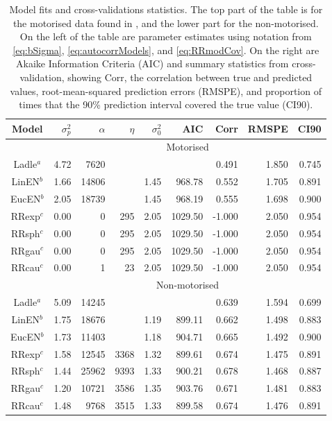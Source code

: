\documentclass[11pt, titlepage]{article}\usepackage[]{graphicx}\usepackage[]{color}
\begin{document}
\begin{spacing}{1.9}
\begin{flushleft}
\newpage
\begin{table}[ht]
				\caption{Model fits and cross-validations statistics. The top part of the table is for the motorised data found in \citet{Ladl:Avga:Whea:Boyc:pred:2016}, and the lower part for the non-motorised. On the left of the table are parameter estimates using notation from \ref{eq:bSigma}, \ref{eq:autocorrModels}, and \ref{eq:RRmodCov}. On the right are Akaike Information Criteria (AIC) and summary statistics from cross-validation, showing Corr, the correlation between true and predicted values, root-mean-squared prediction errors (RMSPE), and proportion of times that the 90\% prediction interval covered the true value (CI90).  \label{Tab:CVstats}}
\begin{center}
\begin{tabular}{c|rrrr|rrrr}
  \hline
  \hline
  Model & $\sigma^2_p$ & $\alpha$ & $\eta$ & $\sigma^2_0$ & AIC & Corr & RMSPE & CI90 \\
	\hline
	& \multicolumn{8}{c}{Motorised} \\
  \hline
Ladle$^a$ & 4.72 & 7620 &  &  &  & 0.491 & 1.850 & 0.745 \\ 
  LinEN$^b$ & 1.66 & 14806 &  & 1.45 & 968.78 & 0.552 & 1.705 & 0.891 \\ 
  EucEN$^b$ & 2.05 & 18739 &  & 1.45 & 968.19 & 0.555 & 1.698 & 0.900 \\ 
  RRexp$^c$ & 0.00 & 0 & 295 & 2.05 & 1029.50 & -1.000 & 2.050 & 0.954 \\ 
  RRsph$^c$ & 0.00 & 0 & 295 & 2.05 & 1029.50 & -1.000 & 2.050 & 0.954 \\ 
  RRgau$^c$ & 0.00 & 0 & 295 & 2.05 & 1029.50 & -1.000 & 2.050 & 0.954 \\ 
  RRcau$^c$ & 0.00 & 1 & 23 & 2.05 & 1029.50 & -1.000 & 2.050 & 0.954 \\ 
   \hline

	& \multicolumn{8}{c}{Non-motorised} \\
  \hline
Ladle$^a$ & 5.09 & 14245 &  &  &  & 0.639 & 1.594 & 0.699 \\ 
  LinEN$^b$ & 1.75 & 18676 &  & 1.19 & 899.11 & 0.662 & 1.498 & 0.883 \\ 
  EucEN$^b$ & 1.73 & 11403 &  & 1.18 & 904.71 & 0.665 & 1.492 & 0.900 \\ 
  RRexp$^c$ & 1.58 & 12545 & 3368 & 1.32 & 899.61 & 0.674 & 1.475 & 0.891 \\ 
  RRsph$^c$ & 1.44 & 25962 & 9393 & 1.33 & 900.21 & 0.678 & 1.468 & 0.887 \\ 
  RRgau$^c$ & 1.20 & 10721 & 3586 & 1.35 & 903.76 & 0.671 & 1.481 & 0.883 \\ 
  RRcau$^c$ & 1.48 & 9768 & 3515 & 1.33 & 899.58 & 0.674 & 1.476 & 0.891 \\ 
   \hline



\end{tabular}
\end{center}
\end{table}
\end{flushleft}
\end{spacing}
\end{document}
